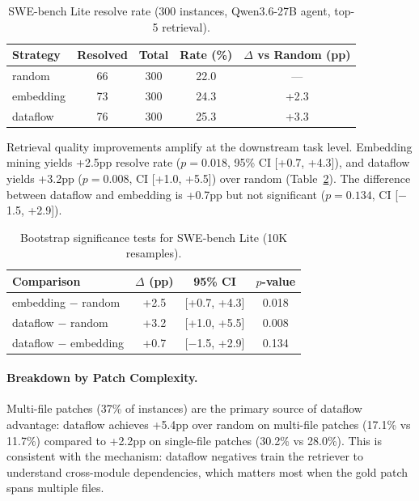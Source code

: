 \documentclass[11pt]{article}
\begin{document}
\begin{table}[h]
\centering
\caption{SWE-bench Lite resolve rate (300 instances, Qwen3.6-27B agent, top-5 retrieval).}
\label{tab:swebench}
\begin{tabular}{lcccc}
\toprule
\textbf{Strategy} & \textbf{Resolved} & \textbf{Total} & \textbf{Rate (\%)} & \textbf{$\Delta$ vs Random (pp)} \\
\midrule
random & 66 & 300 & 22.0 & --- \\
embedding & 73 & 300 & 24.3 & +2.3 \\
dataflow & 76 & 300 & 25.3 & +3.3 \\
\bottomrule
\end{tabular}
\end{table}

Retrieval quality improvements amplify at the downstream task level.
Embedding mining yields +2.5pp resolve rate ($p = 0.018$, 95\% CI [+0.7, +4.3]), and dataflow yields +3.2pp ($p = 0.008$, CI [+1.0, +5.5]) over random (Table~\ref{tab:swebench_bootstrap}).
The difference between dataflow and embedding is +0.7pp but not significant ($p = 0.134$, CI [$-$1.5, +2.9]).

\begin{table}[h]
\centering
\caption{Bootstrap significance tests for SWE-bench Lite (10K resamples).}
\label{tab:swebench_bootstrap}
\begin{tabular}{lccc}
\toprule
\textbf{Comparison} & \textbf{$\Delta$ (pp)} & \textbf{95\% CI} & \textbf{$p$-value} \\
\midrule
embedding $-$ random & +2.5 & [+0.7, +4.3] & 0.018 \\
dataflow $-$ random & +3.2 & [+1.0, +5.5] & 0.008 \\
dataflow $-$ embedding & +0.7 & [$-$1.5, +2.9] & 0.134 \\
\bottomrule
\end{tabular}
\end{table}

\paragraph{Breakdown by Patch Complexity.}
Multi-file patches (37\% of instances) are the primary source of dataflow advantage: dataflow achieves +5.4pp over random on multi-file patches (17.1\% vs 11.7\%) compared to +2.2pp on single-file patches (30.2\% vs 28.0\%).
This is consistent with the mechanism: dataflow negatives train the retriever to understand cross-module dependencies, which matters most when the gold patch spans multiple files.
\end{document}
